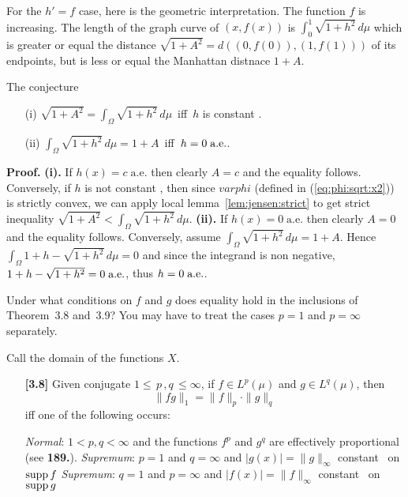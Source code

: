 \begin{enumerate}
For the \(h'=f\) case, here is the geometric interpretation.
The function $f$ is increasing.
The length of the graph curve of \((x,f(x))\) is
\(\int_0^1 \sqrt{1+h^2}\,d\mu\) which is greater or equal
the distance \(\sqrt{1+A^2}=d((0,f(0)),(1,f(1)))\) of its endpoints,
but is less or equal the Manhattan distnace \(1+A\).

The conjecture
\begin{itemize}
 \item[(i)]  \(\sqrt{1+A^2} = \int_\Omega \sqrt{1+h^2}\,d\mu\)
             \,iff\, $h$ is constant \aded.
 \item[(ii)]  \(\int_\Omega \sqrt{1+h^2}\,d\mu = 1 + A\)
             \,iff\, \(h=0\;\textrm{a.e.}\).
\end{itemize}

\textbf{Proof.}
\newline
\textbf{(i).} If \(h(x)=c \;\textrm{a.e.}\)
then clearly \(A=c\) and the equality follows. Conversely,
if $h$ is not constant \aded, then
since \(varphi\) (defined in (\ref{eq:phi:sqrt:x2})) is strictly convex,
we can apply local lemma~\ref{lem:jensen:strict}
to get strict inequality
\(\sqrt{1+A^2} < \int_\Omega \sqrt{1+h^2}\,d\mu\).
\newline
\textbf{(ii).} If \(h(x)=0 \;\textrm{a.e.}\) then clearly \(A=0\)
and the equality follows. Conversely, assume
\(\int_\Omega \sqrt{1+h^2}\,d\mu = 1 + A\).
Hence
\(\int_\Omega 1 + h - \sqrt{1+h^2}\,d\mu = 0\) and since the integrand
is non negative, \(1 + h - \sqrt{1+h^2} = 0\;\textrm{a.e.}\), thus \(h=0\;\textrm{a.e.}\).

\begin{excopy}
Under what conditions on $f$ and $g$ does equality hold in the inclusions
of Theorem~3.8 and~3.9? You may have to treat the cases \(p=1\) and \(p=\infty\)
separately.
\end{excopy}

Call the domain of the functions $X$.
\begin{itemize}
 \item[\textbf{[3.8]}]
  Given conjugate \(1\leq \,p\,,q\,\leq \infty\),
  if \(f\in L^p(\mu)\)
  and \(g\in L^q(\mu)\), then
  \begin{equation} \label{eq:fg1:eq:fpgq}
      \|fg\|_1 = \|f\|_p\cdot\|g\|_q
  \end{equation}
  iff one of the following occurs:
\begin{itemize}
 \itemdim \emph{Normal}: \(1<p,q<\infty\) and
        the functions \(f^p\) and \(g^q\) are effectively proportional
        (see \cite{Hardy:1952:I} \textbf{189.}).
 \itemdim \emph{Supremum}:
            \(p=1\) and \(q=\infty\) and
            \(|g(x)| = \|g\|_\infty\) constant \aded\ on \(\mathop{\rm supp}\nolimits f\)
 \itemdim \emph{Supremum}:
            \(q=1\) and \(p=\infty\) and
            \(|f(x)| = \|f\|_\infty\) constant \aded\ on \(\mathop{\rm supp}\nolimits g\)
\end{itemize}


\end{itemize}
\end{enumerate}
